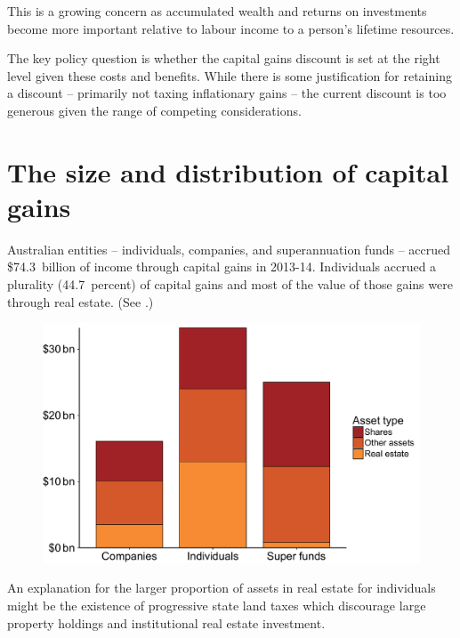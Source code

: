 \documentclass{grattan}\usepackage[]{graphicx}\usepackage[]{color}
\begin{document}
This is a growing concern as accumulated wealth and returns on investments become more important relative to labour income to a person's lifetime resources.

The key policy question is whether the capital gains discount is set at the right level given these costs and benefits. While there is some justification for retaining a discount -- primarily not taxing inflationary gains -- the current discount is too generous given the range of competing considerations. 

\section{The size and distribution of capital gains}






Australian entities -- individuals, companies, and superannuation funds -- accrued \$74.3~billion of income through capital gains in 2013-14. Individuals accrued a plurality (44.7~percent) 
of capital gains and most of the value of those gains were through real estate. (See .)
\begin{figure}
\includegraphics[width=\columnwidth]{CGT-NG-atlas//CGT-by-entity-asset-1}
\end{figure}

An explanation for the larger proportion of assets in real estate for individuals might be the existence of progressive state land taxes which discourage large property holdings and institutional real estate investment.
\end{document}

